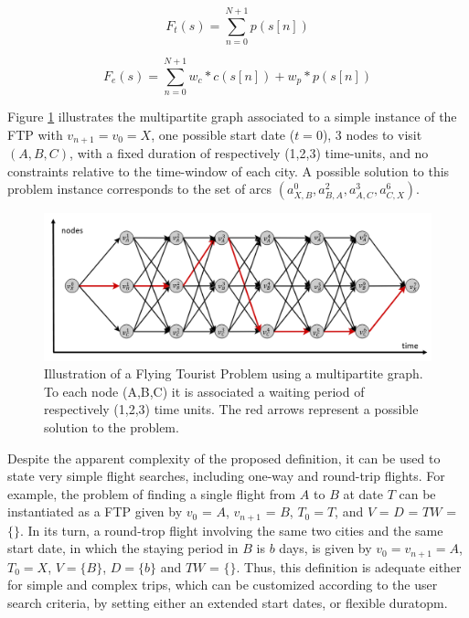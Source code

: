 \begin{equation}
\label{eq:obj_time}
  F_{t}(s) = \sum_{n=0}^{N+1} p(s[n])
\end{equation}

\begin{equation}
\label{eq:obj_entropy}
  F_{e}(s) = \sum_{n=0}^{N+1} w_c*c(s[n]) + w_p*p(s[n])
\end{equation}

Figure \ref{fig:multipartite_sol} illustrates the multipartite graph associated
to a simple instance of the FTP with $v_{n+1} = v_0 = X$, one possible start
date ($t = 0$), 3 nodes to visit $(A, B, C)$, with a fixed duration of
respectively (1,2,3) time-units, and no constraints relative to the time-window
of each city. A possible solution to this problem instance corresponds to the
set of arcs $(a_{X,B}^{0}, a_{B,A}^{2}, a_{A,C}^{3}, a_{C,X}^{6})$.

\begin{figure}[tbp]
  \centering
  \includegraphics[width=1.0\columnwidth]{./imgs/multipartite_axis.png}
  \caption{Illustration of a Flying Tourist Problem using a multipartite graph. To each node (A,B,C) it is associated a waiting period of respectively (1,2,3) time units. The red arrows represent a possible solution to the problem.}
  \label{fig:multipartite_sol}  
\end{figure}


Despite the apparent complexity of the proposed definition, it can be used to
state very simple flight searches, including one-way and round-trip flights. For
example, the problem of finding a single flight from $A$ to $B$ at date $T$ can
be instantiated as a FTP given by $v_0$ = $A$, $v_{n+1}$ = $B$, $T_{0} = T$, and
$V$ = $D$ = $TW$ = $\{\}$. In its turn, a round-trop flight involving the same
two cities and the same start date, in which the staying period in $B$ is $b$
days, is given by $v_0 = v_{n+1} = A$, $T_{0} = X$, $V = \{B\}$, $D = \{b\}$ and
$TW$ = $\{\}$. Thus, this definition is adequate either for simple and complex
trips, which can be customized according to the user search criteria, by setting
either an extended start dates, or flexible duratopm.

